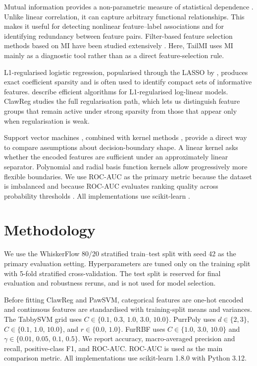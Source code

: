 \documentclass[11pt]{article}
\begin{document}
Mutual information provides a non-parametric measure of statistical dependence \citep{shannon1948mathematical,cover2006elements}. Unlike linear correlation, it can capture arbitrary functional relationships. This makes it useful for detecting nonlinear feature--label associations and for identifying redundancy between feature pairs. Filter-based feature selection methods based on MI have been studied extensively \citep{hastie2009elements}. Here, TailMI uses MI mainly as a diagnostic tool rather than as a direct feature-selection rule.

L1-regularised logistic regression, popularised through the LASSO by \citet{tibshirani1996regression}, produces exact coefficient sparsity and is often used to identify compact sets of informative features. \citet{andrew2007scalable} describe efficient algorithms for L1-regularised log-linear models. ClawReg studies the full regularisation path, which lets us distinguish feature groups that remain active under strong sparsity from those that appear only when regularisation is weak.

Support vector machines \citep{cortes1995support}, combined with kernel methods \citep{boser1992training}, provide a direct way to compare assumptions about decision-boundary shape. A linear kernel asks whether the encoded features are sufficient under an approximately linear separator. Polynomial and radial basis function kernels allow progressively more flexible boundaries. We use ROC-AUC as the primary metric because the dataset is imbalanced and because ROC-AUC evaluates ranking quality across probability thresholds \citep{fawcett2006introduction,hand2009measuring}. All implementations use scikit-learn \citep{pedregosa2011scikit}.

\section{Methodology}
\label{sec:methodology}

We use the WhiskerFlow 80/20 stratified train--test split with seed 42 as the primary evaluation setting. Hyperparameters are tuned only on the training split with 5-fold stratified cross-validation. The test split is reserved for final evaluation and robustness reruns, and is not used for model selection.

Before fitting ClawReg and PawSVM, categorical features are one-hot encoded and continuous features are standardised with training-split means and variances. The TabbySVM grid uses $C \in \{0.1,\, 0.3,\, 1.0,\, 3.0,\, 10.0\}$. PurrPoly uses $d \in \{2, 3\}$, $C \in \{0.1,\, 1.0,\, 10.0\}$, and $r \in \{0.0,\, 1.0\}$. FurRBF uses $C \in \{1.0,\, 3.0,\, 10.0\}$ and $\gamma \in \{0.01,\, 0.05,\, 0.1,\, 0.5\}$. We report accuracy, macro-averaged precision and recall, positive-class F1, and ROC-AUC. ROC-AUC is used as the main comparison metric. All implementations use scikit-learn 1.8.0 \citep{pedregosa2011scikit} with Python 3.12.
\end{document}

